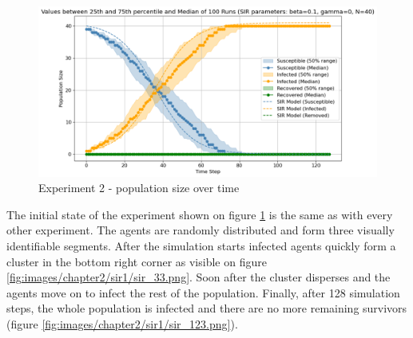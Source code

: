 
\begin{figure}[H]
    \centering
    \includegraphics[width=1.0\textwidth]{images/chapter2/experiment2.png}
    \caption{Experiment 2 - population size over time}\label{fig:images/chapter2/experiment2.png}
\end{figure}

The initial state of the experiment shown on figure \ref{fig:images/chapter2/experiment2.png} is the same as with every other experiment.
The agents are randomly distributed and form three visually identifiable segments.
After the simulation starts infected agents quickly form a cluster in the bottom right corner as visible on figure \ref{fig:images/chapter2/sir1/sir_33.png}.
Soon after the cluster disperses and the agents move on to infect the rest of the population.
Finally, after 128 simulation steps, the whole population is infected and there are no more remaining survivors (figure \ref{fig:images/chapter2/sir1/sir_123.png}).


